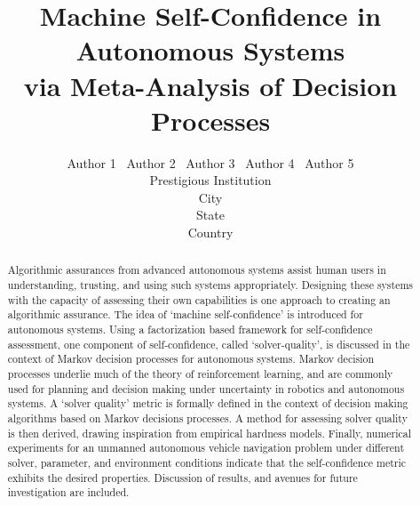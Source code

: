 \documentclass[letterpaper]{article}
\title{Machine Self-Confidence in Autonomous Systems \\ via  Meta-Analysis of Decision Processes}%
\author{Author 1 \ Author 2 \ Author 3 \ Author 4 \ Author 5\\ 
        Prestigious Institution\\
        City\\
        State\\
        Country
    }\\
\begin{document}
\maketitle
\begin{abstract}
    Algorithmic assurances from advanced autonomous systems assist human users in understanding, trusting, and using such systems appropriately. Designing these systems with the capacity of assessing their own capabilities is one approach to creating an algorithmic assurance. The idea of `machine self-confidence' is introduced for autonomous systems. Using a factorization based framework for self-confidence assessment, one component of self-confidence, called `solver-quality', is discussed in the context of Markov decision processes for autonomous systems. Markov decision processes underlie much of the theory of reinforcement learning, and are commonly used for planning and decision making under uncertainty in robotics and autonomous systems. A `solver quality' metric is formally defined in the context of decision making algorithms based on Markov decisions processes. A method for assessing solver quality  is then derived, drawing inspiration from empirical hardness models. Finally, numerical experiments for an unmanned autonomous vehicle navigation problem under different solver, parameter, and environment conditions indicate that the self-confidence metric exhibits the desired properties. Discussion of results, and avenues for future investigation are included.
\end{abstract}









\end{document}
